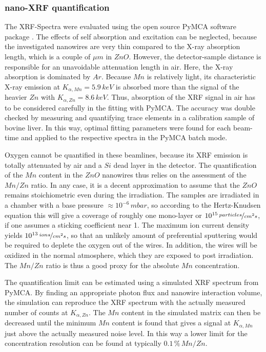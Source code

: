 \subsubsection{nano-XRF quantification}

The XRF-Spectra were evaluated using the open source PyMCA software package \cite{sole_multiplatform_2007}. The effects of self absorption and excitation can be neglected, because the investigated nanowires are very thin compared to the X-ray absorption length, which is a couple of $\mu m$ in $ZnO$. However, the detector-sample distance is responsible for an unavoidable attenuation length in air. Here, the X-ray absorption is dominated by $Ar$. Because $Mn$ is relatively light, its characteristic X-ray emission at $K_{\alpha,Mn} = 5.9\,keV$ is absorbed more than the signal of the heavier $Zn$ with $K_{\alpha,Zn} = 8.6\,keV$. Thus, absorption of the XRF signal in air has to be considered carefully in the fitting with PyMCA. The accuracy was double checked by measuring and quantifying trace elements in a calibration sample of bovine liver. In this way, optimal fitting parameters were found for each beam-time and applied to the respective spectra in the PyMCA batch mode. 

Oxygen cannot be quantified in these beamlines, because its XRF emission is totally attenuated by air and a $Si$ dead layer in the detector. The quantification of the $Mn$ content in the $ZnO$ nanowires thus relies on the assessment of the $Mn/Zn$ ratio. In any case, it is a decent approximation to assume that the $ZnO$ remains stoichiometric even during the irradiation. The samples are irradiated in a chamber with a base pressure $\approx 10^{-6}\,mbar$, so according to the Hertz-Knudsen equation \cite{kolasinski_surface_2012} this will give a coverage of roughly one mono-layer or $10^{15}\,\nicefrac{particles}{cm^2s}$, if one assumes a sticking coefficient near 1. The maximum ion current density yields $10^{13}\,\nicefrac{ions}{cm^2s}$, so that an unlikely amount of preferential sputtering would be required to deplete the oxygen out of the wires. In addition, the wires will be oxidized in the normal atmosphere, which they are exposed to post irradiation. The $Mn/Zn$ ratio is thus a good proxy for the absolute $Mn$ concentration.

The quantification limit can be estimated using a simulated XRF spectrum from PyMCA. By finding an appropriate photon flux and nanowire interaction volume, the simulation can reproduce the XRF spectrum with the actually measured number of counts at $K_{\alpha,Zn}$. The $Mn$ content in the simulated matrix can then be decreased until the minimum $Mn$ content is found that gives a signal at $K_{\alpha,Mn}$ just above the actually measured noise level. In this way a lower limit for the concentration resolution can be found at typically $0.1\,\%\,Mn/Zn$.



